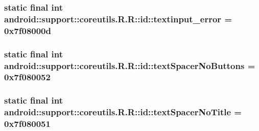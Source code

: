 \hypertarget{classandroid_1_1support_1_1coreutils_1_1_r_1_1id_ec0ef39c698cc2b662414a526538e3f5}{
\subsubsection[{textinput\_\-error}]{\setlength{\rightskip}{0pt plus 5cm}static final int android::support::coreutils.R.R::id::textinput\_\-error = 0x7f08000d}}
\label{classandroid_1_1support_1_1coreutils_1_1_r_1_1id_ec0ef39c698cc2b662414a526538e3f5}


\hypertarget{classandroid_1_1support_1_1coreutils_1_1_r_1_1id_dfd4506c229aef003a44f4e6fc80ed0b}{
\subsubsection[{textSpacerNoButtons}]{\setlength{\rightskip}{0pt plus 5cm}static final int android::support::coreutils.R.R::id::textSpacerNoButtons = 0x7f080052}}
\label{classandroid_1_1support_1_1coreutils_1_1_r_1_1id_dfd4506c229aef003a44f4e6fc80ed0b}


\hypertarget{classandroid_1_1support_1_1coreutils_1_1_r_1_1id_3ba057717da45b50936211681152dc60}{
\subsubsection[{textSpacerNoTitle}]{\setlength{\rightskip}{0pt plus 5cm}static final int android::support::coreutils.R.R::id::textSpacerNoTitle = 0x7f080051}}
\label{classandroid_1_1support_1_1coreutils_1_1_r_1_1id_3ba057717da45b50936211681152dc60}


